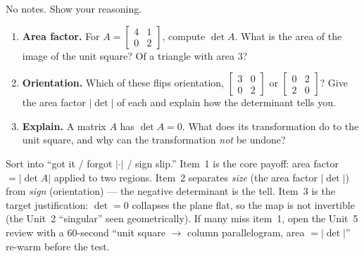 \documentclass[10pt]{article}
\begin{document}
\namedateperiod

\vspace{0.15in}

No notes. Show your reasoning.

\begin{enumerate}[leftmargin=1.8em, itemsep=16pt]
  \item \textbf{Area factor.} For $A=\begin{bmatrix} 4 & 1 \\ 0 & 2 \end{bmatrix}$, compute $\det A$.
        What is the area of the image of the unit square? Of a triangle with area $3$?
  \item \textbf{Orientation.} Which of these flips orientation, $\begin{bmatrix} 3 & 0 \\ 0 & 2
        \end{bmatrix}$ or $\begin{bmatrix} 0 & 2 \\ 2 & 0 \end{bmatrix}$? Give the area factor $|\det|$ of
        each and explain how the determinant tells you.
  \item \textbf{Explain.} A matrix $A$ has $\det A=0$. What does its transformation do to the unit
        square, and why can the transformation \emph{not} be undone? 
\end{enumerate}

\begin{teachernote}
Sort into ``got it / forgot $|\cdot|$ / sign slip.'' Item~1 is the core payoff: area factor $=|\det A|$
applied to two regions. Item~2 separates \emph{size} (the area factor $|\det|$) from \emph{sign}
(orientation) --- the negative determinant is the tell. Item~3 is the target justification: $\det=0$
collapses the plane flat, so the map is not invertible (the Unit~2 ``singular'' seen geometrically). If
many miss item~1, open the Unit~5 review with a 60-second ``unit square $\to$ column parallelogram, area
$=|\det|$'' re-warm before the test.
\end{teachernote}
\end{document}
